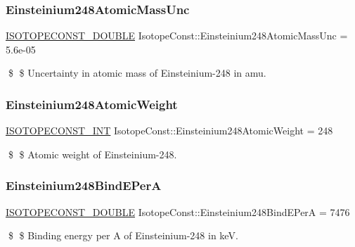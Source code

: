 \subsubsection{\texorpdfstring{Einsteinium248\+Atomic\+Mass\+Unc}{Einsteinium248AtomicMassUnc}}
{\footnotesize\ttfamily \mbox{\hyperlink{group___isotope_const-_macros_ga8f45a7272ce02c0b4c65c44636ed719a}{I\+S\+O\+T\+O\+P\+E\+C\+O\+N\+S\+T\+\_\+\+D\+O\+U\+B\+LE}} Isotope\+Const\+::\+Einsteinium248\+Atomic\+Mass\+Unc = 5.\+6e-\/05}

\$ \$ Uncertainty in atomic mass of Einsteinium-\/248 in amu. \mbox{\label{group___isotope_const-_einsteinium-_es248_gabc4dc175fb8f280ede25c40f7a047b51}} 
\subsubsection{\texorpdfstring{Einsteinium248\+Atomic\+Weight}{Einsteinium248AtomicWeight}}
{\footnotesize\ttfamily \mbox{\hyperlink{group___isotope_const-_macros_ga5f18360b3e99483a35c32d789e62621c}{I\+S\+O\+T\+O\+P\+E\+C\+O\+N\+S\+T\+\_\+\+I\+NT}} Isotope\+Const\+::\+Einsteinium248\+Atomic\+Weight = 248}

\$ \$ Atomic weight of Einsteinium-\/248. \mbox{\label{group___isotope_const-_einsteinium-_es248_ga08b3ffe7aa5c708078729de9fb2e8b29}} 
\subsubsection{\texorpdfstring{Einsteinium248\+Bind\+E\+PerA}{Einsteinium248BindEPerA}}
{\footnotesize\ttfamily \mbox{\hyperlink{group___isotope_const-_macros_ga8f45a7272ce02c0b4c65c44636ed719a}{I\+S\+O\+T\+O\+P\+E\+C\+O\+N\+S\+T\+\_\+\+D\+O\+U\+B\+LE}} Isotope\+Const\+::\+Einsteinium248\+Bind\+E\+PerA = 7476}

\$ \$ Binding energy per A of Einsteinium-\/248 in keV. \mbox{\label{group___isotope_const-_einsteinium-_es248_ga39caf7e4ff579f03495d7c194542b9e2}} 
